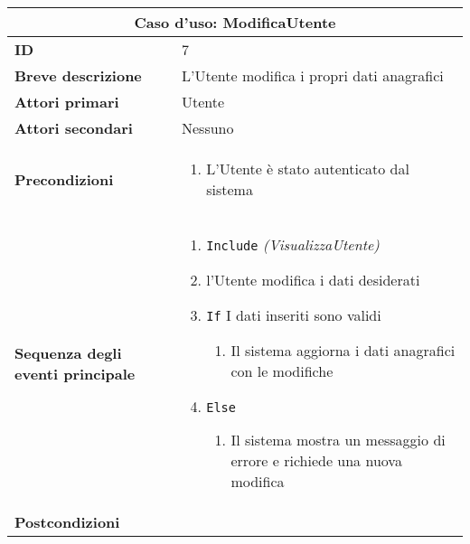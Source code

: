 \documentclass[a4paper]{report}
\begin{document}
\clearpage
\begin{table}[H]
\vspace*{-0cm}
\renewcommand{\arraystretch}{1.9}
\begin{tabular}{|p{3.9cm}|p{9.9cm}|}
\hline
\multicolumn{2}{|c|}{\textbf{Caso d’uso: ModificaUtente}} \\ \hline
\textbf{ID} & 7 \\ \hline
\textbf{Breve descrizione} &  L’Utente modifica i propri dati anagrafici \\ \hline
\textbf{Attori primari} & Utente \\ \hline
\textbf{Attori secondari} & Nessuno \\ \hline
\textbf{Precondizioni} & \begin{enumerate}[leftmargin=14pt,label=\arabic*.,labelsep=0.5em,topsep=0pt,partopsep=0pt,parsep=0pt,itemsep=0pt]
    \item L’Utente è stato autenticato dal sistema
\end{enumerate} \\ \hline
\textbf{Sequenza degli eventi principale} &
\begin{enumerate}[leftmargin=14pt,label=\arabic*.,labelsep=0.5em,topsep=0pt,partopsep=0pt,parsep=0pt,itemsep=0pt]
    \item \texttt{Include} \textit{(VisualizzaUtente)} 
    \item l’Utente modifica i dati desiderati
    \item \texttt{If} I dati inseriti sono validi
    \begin{enumerate}[label=\arabic{enumi}.\arabic*.,leftmargin=22pt,labelsep=0.5em,topsep=0pt,partopsep=0pt,parsep=0pt,itemsep=0pt]
        \item Il sistema aggiorna i dati anagrafici con le modifiche
    \end{enumerate}
    \item \texttt{Else}
    \begin{enumerate}[label=\arabic{enumi}.\arabic*.,leftmargin=22pt,labelsep=0.5em,topsep=0pt,partopsep=0pt,parsep=0pt,itemsep=0pt]
        \item Il sistema mostra un messaggio di errore e richiede una nuova modifica
    \end{enumerate}
\end{enumerate}\\ \hline
\textbf{Postcondizioni} & \begin{enumerate}[leftmargin=14pt,label=\arabic*.,labelsep=0.5em,topsep=0pt,partopsep=0pt,parsep=0pt,itemsep=0pt]

\end{enumerate}
\end{tabular}
\end{table}
\end{document}
